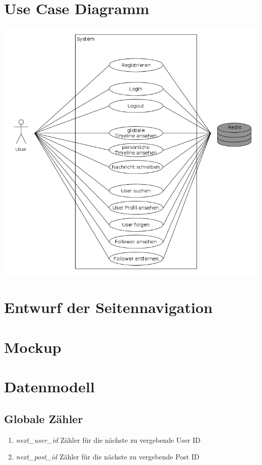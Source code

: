\documentclass[
    a4paper
]{scrreprt}
\begin{document}
    \section{Use Case Diagramm}
    \includegraphics[width=\textwidth]{./images/useCaseDiagramm.png}
    \section{Entwurf der Seitennavigation}
    
    \section{Mockup}
    
    \section{Datenmodell}
    
    \subsection*{Globale Zähler}
		\begin{enumerate}
			\item \textit{next\_user\_id} {Zähler für die nächste zu vergebende User ID}
			\item \textit{next\_post\_id} {Zähler für die nächste zu vergebende Post ID}
		\end{enumerate}
	
\end{document}

